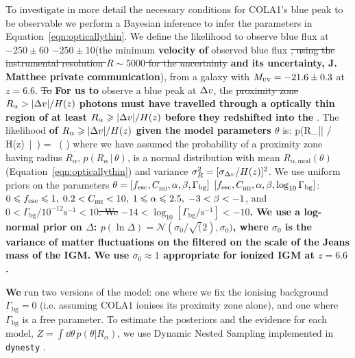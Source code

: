\documentclass[fleqn,usenatbib]{mnras}
\providecommand{\DIFadd}[1]{{\protect\color{Green} \bf #1}} %
\providecommand{\DIFdel}[1]{{\protect\color{lightgray} \footnotesize \sout{#1}}} %
\providecommand{\DIFaddbegin}{} %
\providecommand{\DIFaddend}{} %
\providecommand{\DIFdelbegin}{} %
\providecommand{\DIFdelend}{} %
\newcommand{\DIFscaledelfig}{0.5}
\newlength{\DIFdelgraphicswidth} %
\newlength{\DIFdelgraphicsheight} %
\newcommand{\DIFaddincludegraphics}[2][]{{\color{blue}\fbox{\DIFOincludegraphics[#1]{#2}}}} %
\newcommand{\DIFdelincludegraphics}[2][]{%
\sbox{\DIFdelgraphicsbox}{\DIFOincludegraphics[#1]{#2}}%
\settoboxwidth{\DIFdelgraphicswidth}{\DIFdelgraphicsbox} %
\settoboxtotalheight{\DIFdelgraphicsheight}{\DIFdelgraphicsbox} %
\scalebox{\DIFscaledelfig}{%
\parbox[b]{\DIFdelgraphicswidth}{\usebox{\DIFdelgraphicsbox}\\[-\baselineskip] \rule{\DIFdelgraphicswidth}{0em}}\llap{\resizebox{\DIFdelgraphicswidth}{\DIFdelgraphicsheight}{%
\setlength{\unitlength}{\DIFdelgraphicswidth}%
\begin{picture}(1,1)%
\thicklines\linethickness{2pt} %
{\color[rgb]{1,0,0}\put(0,0){\framebox(1,1){}}}%
{\color[rgb]{1,0,0}\put(0,0){\line( 1,1){1}}}%
{\color[rgb]{1,0,0}\put(0,1){\line(1,-1){1}}}%
\end{picture}%
}\hspace*{3pt}}} %
} %
\DeclareRobustCommand{\DIFaddbegin}{\DIFOaddbegin \let\includegraphics\DIFaddincludegraphics} %
\DeclareRobustCommand{\DIFaddend}{\DIFOaddend \let\includegraphics\DIFOincludegraphics} %
\DeclareRobustCommand{\DIFdelbegin}{\DIFOdelbegin \let\includegraphics\DIFdelincludegraphics} %
\DeclareRobustCommand{\DIFdelend}{\DIFOaddend \let\includegraphics\DIFOincludegraphics} %
\begin{document}
To investigate in more detail the necessary conditions for COLA1's blue peak to be observable we perform a Bayesian inference to infer the parameters in Equation~\eqref{eqn:opticallythin}. We define the likelihood to observe blue \lya flux at \DIFdelbegin \DIFdel{$-250\pm60$}\DIFdelend \DIFaddbegin \DIFadd{$-250\pm10$}\DIFaddend \kms (the minimum \DIFaddbegin \DIFadd{velocity of }\DIFaddend observed blue flux \DIFdelbegin \DIFdel{, using the instrumental resolution $R\sim5000$ for the uncertainty}\DIFdelend \DIFaddbegin \DIFadd{and its uncertainty, J. Matthee private communication}\DIFaddend ), from a galaxy with $\MUV = -21.6\pm0.3$ at $z=6.6$. \DIFdelbegin \DIFdel{To }\DIFdelend \DIFaddbegin \DIFadd{For us to }\DIFaddend observe a blue peak at $\DV$, the \DIFdelbegin \DIFdel{proximity zone $R_\alpha > |\DV| / H(z)$}\DIFdelend \DIFaddbegin \DIFadd{photons must have travelled through a optically thin region of at least $R_\alpha \geq |\DV| / H(z)$ before they redshifted into the }\lya\DIFadd{\ resonant frequency}\DIFaddend . The likelihood \DIFaddbegin \DIFadd{of $R_\alpha \geq |\DV| / H(z)$ given the model parameters $\theta$ }\DIFaddend is:
%
\BE \label{eqn:like}
p(R_\alpha \geq |\DV| / H(z) \,|\, \theta) =  \, \left( \right)
\EE
%
where we have assumed the probability of a proximity zone having radius $R_\alpha$, $p(R_\alpha \,|\, \theta)$, is a normal distribution with mean $R_{\alpha,\mathrm{mod}}(\theta)$ (Equation~\ref{eqn:opticallythin}) and variance $\sigma_R^2 = [\sigma_{\DV}/H(z)]^2$. We use uniform priors on the parameters \DIFdelbegin \DIFdel{$\theta = [\fesc, \clump, \alpha, \beta, \Gamma_\mathrm{bg}]$}\DIFdelend \DIFaddbegin \DIFadd{$[\fesc, \clump, \alpha, \beta, \log_{10}\Gamma_\mathrm{bg}]$}\DIFaddend : $0 \leq \fesc \leq 1, \; 0.2 < \clump < 10, \; 1 \leq \alpha \leq 2.5, \;-3 < \beta < -1$, and \DIFdelbegin \DIFdel{$0 < \Gamma_\mathrm{bg}/10^{-12}\mathrm{s}^{-1} < 10$. We }\DIFdelend \DIFaddbegin \DIFadd{$-14 < \log_{10}[\Gamma_\mathrm{bg}/\mathrm{s}^{-1}] <-10$. We use a log-normal prior on $\Delta$: $p(\ln{\Delta}) = \mathcal{N}(\sigma_0/\sqrt(2), \sigma_0)$, where $\sigma_0$ is the variance of matter fluctuations on the filtered on the scale of the Jeans mass of the IGM. We use $\sigma_0 \approx 1$ appropriate for ionized IGM at $z=6.6$ }\citep[e.g.,][]{Bi1997,Bi2003}\DIFadd{.
}

\DIFadd{We }\DIFaddend run two versions of the model: one where we fix the ionising background $\Gamma_\mathrm{bg} = 0$ (i.e. assuming COLA1 ionises its proximity zone alone), and one where $\Gamma_\mathrm{bg}$ is a free parameter. To estimate the posteriors and the evidence for each model, $Z = \int \dd \theta \, p(\theta | R_\alpha)$, we use Dynamic Nested Sampling implemented in \verb|dynesty| \citep{Speagle2019}.
\end{document}
